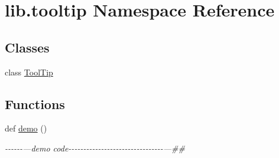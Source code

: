 \hypertarget{namespacelib_1_1tooltip}{}\section{lib.\+tooltip Namespace Reference}
\label{namespacelib_1_1tooltip}
\subsection*{Classes}
\begin{DoxyCompactItemize}
\item 
class \hyperlink{classlib_1_1tooltip_1_1_tool_tip}{Tool\+Tip}
\end{DoxyCompactItemize}
\subsection*{Functions}
\begin{DoxyCompactItemize}
\item 
\mbox{\label{namespacelib_1_1tooltip_a161baaa26476dc5795fa1e2b442b9d34}} 
def \hyperlink{namespacelib_1_1tooltip_a161baaa26476dc5795fa1e2b442b9d34}{demo} ()
\begin{DoxyCompactList}\small\item\em -\/-\/-\/-\/-\/-\/---demo code-\/-\/-\/-\/-\/-\/-\/-\/-\/-\/-\/-\/-\/-\/-\/-\/-\/-\/-\/-\/-\/-\/-\/-\/-\/-\/-\/-\/-\/-\/-\/-\/---\#\# \end{DoxyCompactList}\end{DoxyCompactItemize}


